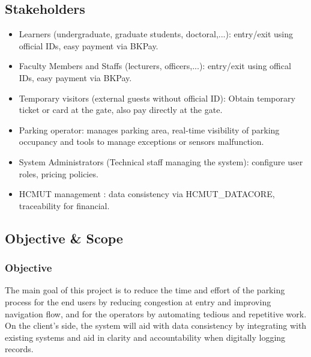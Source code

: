\subsection{Stakeholders}
\begin{itemize}
    \item Learners (undergraduate, graduate students, doctoral,...): entry/exit using official IDs, easy payment via BKPay.
    \item Faculty Members and Staffs (lecturers, officers,...): entry/exit using offical IDs, easy payment via BKPay.
    \item Temporary visitors (external guests without official ID): Obtain temporary ticket or card at the gate, also pay directly at the gate.
    \item Parking operator: manages parking area, real-time visibility of parking occupancy and tools to manage exceptions or sensors malfunction.
    \item System Administrators (Technical staff managing the system): configure user roles, pricing policies.
    \item HCMUT management : data consistency via HCMUT\_DATACORE, traceability for financial.


\end{itemize}
\subsection{Objective \& Scope}
\subsubsection{Objective}
The main goal of this project is to reduce the time and effort of the parking process for the end users by reducing congestion at entry and improving navigation flow, and for the operators by automating tedious and repetitive work. On the client's side, the system will aid with data consistency by integrating with existing systems and aid in clarity and accountability when digitally logging records.

